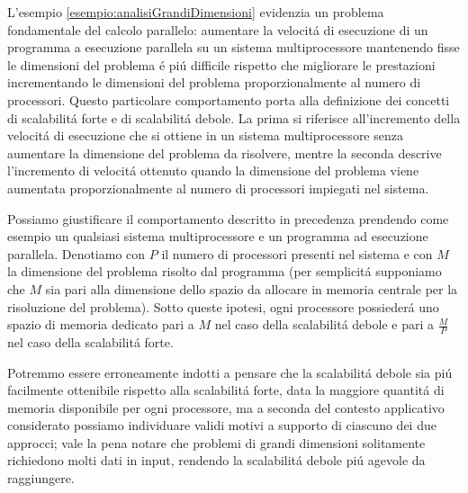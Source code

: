 L'esempio \ref{esempio:analisiGrandiDimensioni} evidenzia un problema fondamentale del calcolo parallelo: aumentare la velocit\'a di esecuzione 
di un programma a esecuzione parallela su un sistema multiprocessore mantenendo fisse le dimensioni del problema \'e pi\'u difficile rispetto che migliorare 
le prestazioni incrementando le dimensioni del problema proporzionalmente al numero di processori.\newline
Questo particolare comportamento porta alla definizione dei concetti di scalabilit\'a forte e di scalabilit\'a debole.\newline
La prima si riferisce all'incremento della velocit\'a di esecuzione che si ottiene in un sistema multiprocessore senza aumentare la dimensione del problema da 
risolvere, mentre la seconda descrive l'incremento di velocit\'a ottenuto quando la dimensione del problema viene aumentata proporzionalmente al numero 
di processori impiegati nel sistema.

Possiamo giustificare il comportamento descritto in precedenza prendendo come esempio un qualsiasi sistema multiprocessore e un programma ad esecuzione parallela.\newline 
Denotiamo con $P$ il numero di processori presenti nel 
sistema e con $M$ la dimensione del problema risolto dal programma (per semplicit\'a supponiamo che $M$ sia pari alla dimensione dello spazio da allocare in memoria centrale per la 
risoluzione del problema).\newline
Sotto queste ipotesi, ogni processore possieder\'a uno spazio di memoria dedicato pari a $M$ nel caso della scalabilit\'a debole e pari a $\frac{M}{P}$ nel 
caso della scalabilit\'a forte.

Potremmo essere erroneamente indotti a pensare che la scalabilit\'a debole sia pi\'u facilmente ottenibile rispetto alla scalabilit\'a forte, data la maggiore quantit\'a di memoria disponibile per ogni processore, ma a seconda 
del contesto applicativo considerato possiamo individuare validi motivi a supporto di ciascuno dei due approcci; vale la pena notare che problemi di grandi 
dimensioni solitamente richiedono molti dati in input, rendendo la scalabilit\'a debole pi\'u agevole da raggiungere.